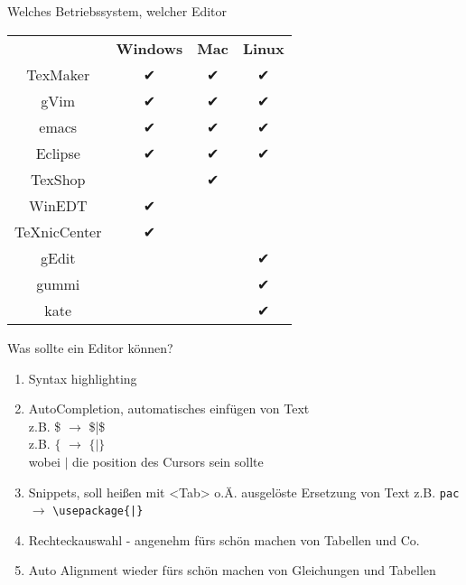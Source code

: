 \documentclass{beamer}
\begin{document}
\subsection{}
\begin{frame}{Welches Betriebssystem, welcher Editor}
    \begin{center}
        \begin{tabular}{c|ccc}
                         & \textbf{Windows} & \textbf{Mac} & \textbf{Linux} \\ \hhline{=|===}
            TexMaker     & ✔                & ✔            & ✔              \\
            gVim         & ✔                & ✔            & ✔              \\
            emacs        & ✔                & ✔            & ✔              \\
            Eclipse      & ✔                & ✔            & ✔              \\ \hline
            TexShop      &                  & ✔            &                \\ \hline
            WinEDT       & ✔                &              &                \\
            TeXnicCenter & ✔                &              &                \\ \hline
            gEdit        &                  &              & ✔              \\
            gummi        &                  &              & ✔              \\
            kate         &                  &              & ✔
        \end{tabular}
    \end{center}
\end{frame}

\begin{frame}{Was sollte ein Editor können?}
    \begin{enumerate}
        \item Syntax highlighting
        \item AutoCompletion, automatisches einfügen von Text\\
              z.B. \$ $→$ \$|\$\\
              z.B. $\{$ $→$ $\{|\}$\\
              wobei $|$ die position des Cursors sein sollte
        \item Snippets, soll heißen mit <Tab> o.Ä. ausgelöste Ersetzung von Text
            z.B. \texttt{pac}\keys{\tab} $→$ \texttt{\backslash usepackage\{|\}}
        \item Rechteckauswahl - angenehm fürs schön machen von Tabellen und Co.
        \item Auto Alignment wieder fürs schön machen von Gleichungen und
              Tabellen
    \end{enumerate}
\end{frame}
\end{document}
